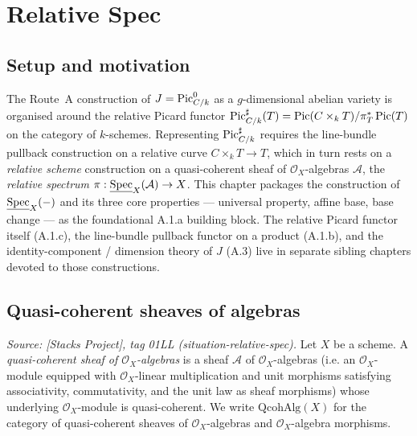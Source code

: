 \chapter{Relative Spec}
\label{chap:Picard_RelativeSpec}

\section{Setup and motivation}
\label{sec:relspec_setup}

The Route~A construction of \(J = \operatorname{Pic}^0_{C/k}\) as a \(g\)-dimensional abelian variety is
organised around the relative Picard functor
\(\operatorname{Pic}^\sharp_{C/k}(T) = \operatorname{Pic}(C \times_k T) / \pi_T^* \operatorname{Pic}(T)\)
on the category of \(k\)-schemes. Representing \(\operatorname{Pic}^\sharp_{C/k}\) requires the line-bundle
pullback construction on a relative curve \(C \times_k T \to T\), which in turn rests on a
\emph{relative scheme} construction on a quasi-coherent sheaf of \(\mathcal{O}_X\)-algebras
\(\mathcal{A}\), the \emph{relative spectrum}
\(\pi : \underline{\operatorname{Spec}}_X(\mathcal{A}) \to X\). This chapter packages the construction
of \(\underline{\operatorname{Spec}}_X(-)\) and its three core properties --- universal property, affine
base, base change --- as the foundational A.1.a building block. The relative Picard
functor itself (A.1.c), the line-bundle pullback functor on a product (A.1.b), and the
identity-component / dimension theory of \(J\) (A.3) live in separate sibling chapters
devoted to those constructions.

\section{Quasi-coherent sheaves of algebras}
\label{sec:qc_sheaf_of_algebras}

\begin{definition}
  \label{def:qc_sheaf_of_algebras}
  \textit{Source: [Stacks Project], tag 01LL (situation-relative-spec).}
  Let \(X\) be a scheme. A \emph{quasi-coherent sheaf of \(\mathcal{O}_X\)-algebras} is a
  sheaf \(\mathcal{A}\) of \(\mathcal{O}_X\)-algebras (i.e. an \(\mathcal{O}_X\)-module
  equipped with \(\mathcal{O}_X\)-linear multiplication and unit morphisms satisfying
  associativity, commutativity, and the unit law as sheaf morphisms) whose underlying
  \(\mathcal{O}_X\)-module is quasi-coherent. We write \(\mathrm{QcohAlg}(X)\) for the
  category of quasi-coherent sheaves of \(\mathcal{O}_X\)-algebras and
  \(\mathcal{O}_X\)-algebra morphisms.
\end{definition}

